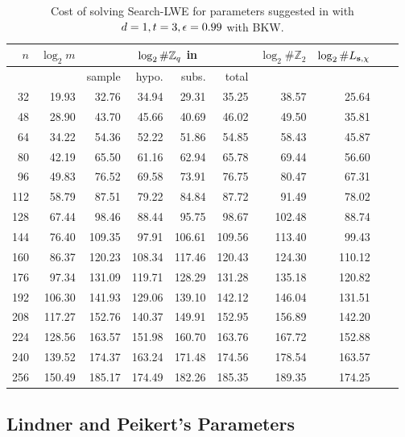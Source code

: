 \begin{table}[!htb]
\begin{center}
\begin{tabular}{|r|r|r|r|r|r|r|r|r|r|} 
\hline
$n$ & $\log_2 m $ & \multicolumn{4}{|c|}{$\log_2 \#\mathbb{Z}_q $ in} & $\log_2 \#\mathbb{Z}_2 $ & $\log_2 \#L_{\mathbf{s},\chi} $\\
\hline
    &                                & sample & hypo. & subs. & total & & \\
\hline
 32 &  19.93 &  32.76 &  34.94 &  29.31 &  35.25 &  38.57 &  25.64\\
 48 &  28.90 &  43.70 &  45.66 &  40.69 &  46.02 &  49.50 &  35.81\\
 64 &  34.22 &  54.36 &  52.22 &  51.86 &  54.85 &  58.43 &  45.87\\
 80 &  42.19 &  65.50 &  61.16 &  62.94 &  65.78 &  69.44 &  56.60\\
 96 &  49.83 &  76.52 &  69.58 &  73.91 &  76.75 &  80.47 &  67.31\\
112 &  58.79 &  87.51 &  79.22 &  84.84 &  87.72 &  91.49 &  78.02\\
128 &  67.44 &  98.46 &  88.44 &  95.75 &  98.67 & 102.48 &  88.74\\
144 &  76.40 & 109.35 &  97.91 & 106.61 & 109.56 & 113.40 &  99.43\\
160 &  86.37 & 120.23 & 108.34 & 117.46 & 120.43 & 124.30 & 110.12\\
176 &  97.34 & 131.09 & 119.71 & 128.29 & 131.28 & 135.18 & 120.82\\
192 & 106.30 & 141.93 & 129.06 & 139.10 & 142.12 & 146.04 & 131.51\\
208 & 117.27 & 152.76 & 140.37 & 149.91 & 152.95 & 156.89 & 142.20\\
224 & 128.56 & 163.57 & 151.98 & 160.70 & 163.76 & 167.72 & 152.88\\
240 & 139.52 & 174.37 & 163.24 & 171.48 & 174.56 & 178.54 & 163.57\\
256 & 150.49 & 185.17 & 174.49 & 182.26 & 185.35 & 189.35 & 174.25\\
\hline
\end{tabular}
\end{center}
\caption{Cost of solving Search-LWE for parameters suggested in \cite{regev:acm09} with $d=1,t=3,\epsilon=0.99$ with BKW.}
\label{tab:concrete_regev}
\end{table}

\subsection{Lindner and Peikert's Parameters}
\label{sec:parameters:pqc}

